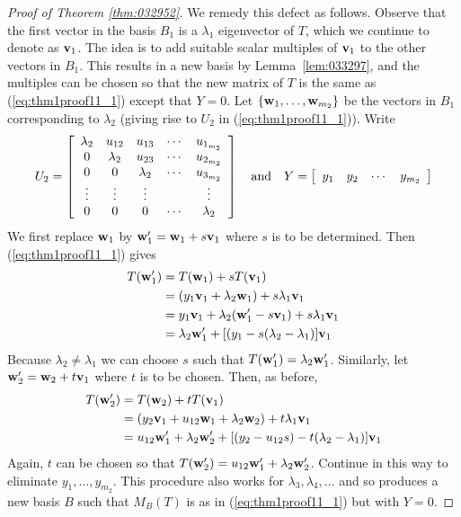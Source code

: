 \begin{proof}[Proof of Theorem \ref{thm:032952}]
We remedy this defect as follows. Observe that the first vector in the basis $B_{1}$ is a $\lambda_{1}$ eigenvector of $T$, which we continue to denote as $\textbf{v}_{1}$. The idea is to add suitable scalar multiples of $\textbf{v}_{1}$ to the other vectors in $B_{1}$. This results in a new basis by Lemma~\ref{lem:033297}, and the multiples can be chosen so that the new matrix of $T$ is the same as (\ref{eq:thm1proof11_1}) except that $Y = 0$. Let $\{\textbf{w}_{1}, \dots, \textbf{w}_{m_{2}}\}$ be the vectors in $B_{1}$ corresponding to $\lambda_{2}$ (giving rise to $U_{2}$ in (\ref{eq:thm1proof11_1})). Write
\begin{equation*}
U_2 = \left[ \begin{array}{ccccc}
\lambda_2 & u_{12} & u_{13} & \cdots & u_{1_{m_2}} \\
0 & \lambda_2 & u_{23} & \cdots & u_{2_{m_2}} \\
0 & 0 & \lambda_2 & \cdots & u_{3_{m_2}} \\
\vdots & \vdots & \vdots &  & \vdots \\
0 & 0 & 0 & \cdots & \lambda_2
\end{array} \right] \quad \mbox{and} \quad
Y = \left[ \begin{array}{cccc}
y_1 & y_2 & \cdots & y_{m_2}
\end{array} \right]
\end{equation*}
We first replace $\textbf{w}_{1}$ by $\textbf{w}_{1}^\prime = \textbf{w}_{1} + s\textbf{v}_{1}$ where $s$ is to be determined. Then (\ref{eq:thm1proof11_1}) gives
\begin{align*}
T(\textbf{w}_{1}^\prime) &= T(\textbf{w}_{1}) + sT(\textbf{v}_{1}) \\
&= (y_1\textbf{v}_1 + \lambda_2\textbf{w}_{1}) + s\lambda_1\textbf{v}_1 \\
&= y_1\textbf{v}_1 + \lambda_2(\textbf{w}_{1}^\prime - s\textbf{v}_1) + s\lambda_1\textbf{v}_1 \\
&= \lambda_2\textbf{w}_{1}^\prime + [(y_1 - s(\lambda_{2} - \lambda_{1})]\textbf{v}_1
\end{align*}
Because $\lambda_{2} \neq \lambda_{1}$ we can choose $s$ such that $T(\textbf{w}_{1}^\prime) = \lambda_2\textbf{w}_{1}^\prime$. Similarly, let $\textbf{w}_2^\prime = \textbf{w}_{2} + t\textbf{v}_{1}$ where $t$ is to be chosen. Then, as before,
\begin{align*}
T(\textbf{w}_{2}^\prime) &= T(\textbf{w}_2) + tT(\textbf{v}_1) \\
&= (y_2\textbf{v}_1 + u_{12}\textbf{w}_1 + \lambda_2\textbf{w}_2) + t\lambda_1\textbf{v}_1 \\
&= u_{12}\textbf{w}_{1}^\prime + \lambda_2\textbf{w}_{2}^\prime + [(y_2 - u_{12}s) - t(\lambda_2 - \lambda_1)]\textbf{v}_1
\end{align*}
Again, $t$ can be chosen so that $T(\textbf{w}_{2}^\prime) = u_{12}\textbf{w}_{1}^\prime + \lambda_2\textbf{w}_{2}^\prime$. Continue in this way to eliminate $y_1, \dots, y_{m_2}$. This procedure also works for $\lambda_{3}, \lambda_{4}, \dots$ and so produces a new basis $B$ such that $M_{B}(T)$ is as in (\ref{eq:thm1proof11_1}) but with $Y = 0$.
\end{proof}

